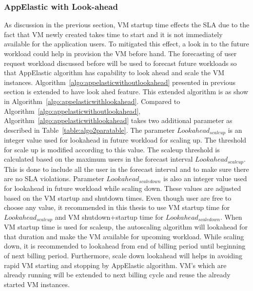 \subsubsection{AppElastic with Look-ahead}
\label{subs:AppElastic with Look-ahead}
As discussion in the previous section, VM startup time effects the SLA due to the fact that VM newly created takes time to start and  it is not immediately available for the application users. To mitigated this effect, a look in to the future workload could help in provision the VM before hand. The forecasting of user request workload discussed before will be used to forecast future workloads so that AppElastic algorithm has capability to look ahead and scale the VM instances. Algorithm~\ref{algo:appelasticwithoutlookahead} presented in previous section is extended to have look ahed feature. This extended algorithm is as show in  Algorithm~\ref{algo:appelasticwithlookahead}. Compared to  Algorithm~\ref{algo:appelasticwithoutlookahead}, Algorithm~\ref{algo:appelasticwithlookahead} takes two additional parameter as described in Table~\ref{table:algo2paratable}. The parameter \( Lookahead_{scaleup} \) is an integer value used for lookahead in future workload for scaling  up. The threshold for scale up is modified according to this value. The scaleup threshold is calculated based on the maximum users in the forecast interval \( Lookahead_{scaleup} \). This is done to include all the user in the forecast interval and to make sure there are no SLA violations. Parameter \( Lookahead_{scaledown} \) is also an integer value used for lookahead in future workload while scaling down. These values are adjusted based on the VM startup and shutdown times. Even though user are free to choose any value, it recommended in this thesis to use VM startup time for \( Lookahead_{scaleup} \) and VM shutdown+startup time for \( Lookahead_{scaledown} \). When VM startup time is used for scaleup, the autoscaling algorithm will lookahead for that duration and make the VM available for upcoming workload. While scaling down, it is recommended to lookahead from end of billing period until beginning of next billing period. Furthermore, scale down lookahead will helps in avoiding rapid VM starting and stopping by AppElastic algorithm. VM's which are already running will be extended to next billing cycle and reuse the already started VM instances.
\LinesNumbered
